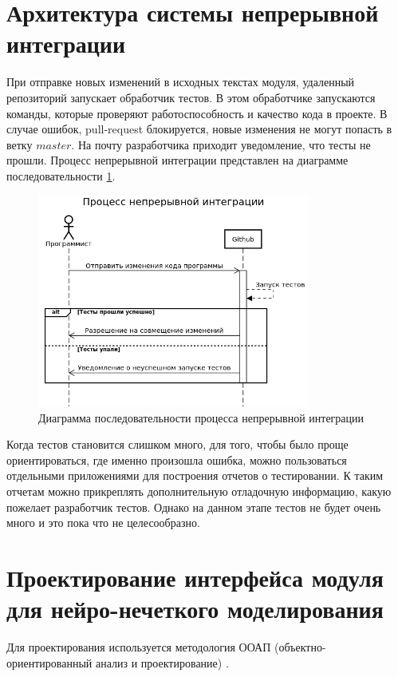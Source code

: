 \section{Архитектура системы непрерывной интеграции}

При отправке новых изменений в исходных текстах модуля,
удаленный репозиторий запускает обработчик тестов.
В этом обработчике запускаются команды, которые
проверяют работоспособность и качество кода в проекте.
В случае ошибок, pull-request блокируется, новые изменения не могут попасть
в ветку $ master $. На почту разработчика приходит уведомление, что
тесты не прошли. Процесс непрерывной интеграции представлен на диаграмме последовательности \ref{img:ci_sequence}.

\def\figurename{Рис}
\begin{figure}[t]
	\centering
	\includegraphics[height=7cm]{./img/ci_sequence.png}
	\caption{Диаграмма  последовательности процесса непрерывной интеграции}
	\label{img:ci_sequence}
\end{figure}

Когда тестов становится слишком много, для того, чтобы было
проще ориентироваться, где именно произошла ошибка,
можно пользоваться отдельными приложениями для построения
отчетов о тестировании. К таким отчетам можно прикреплять
дополнительную отладочную информацию, какую пожелает разработчик тестов.
Однако на данном этапе тестов не будет очень много и это пока что не целесообразно.

\section{Проектирование интерфейса модуля для нейро-нечеткого моделирования}

Для проектирования используется методология ООАП (объектно-ориентированный анализ и проектирование) \cite{маклафлин2013объектно}.

